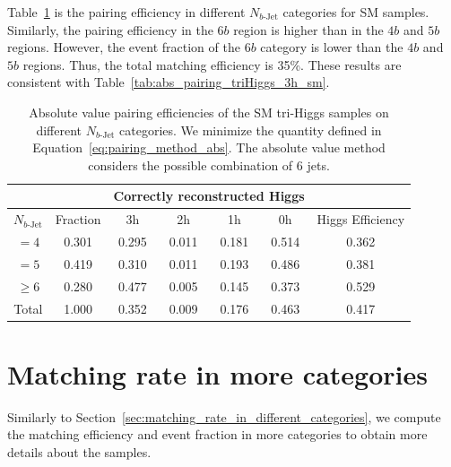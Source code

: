 \documentclass[12pt]{article}
\begin{document}
    Table~\ref{tab:sm_abs_pairing_3h_nbj} is the pairing efficiency in different $N_{b\text{-Jet}}$ categories for SM samples. Similarly, the pairing efficiency in the $6b$ region is higher than in the $4b$ and $5b$ regions. However, the event fraction of the $6b$ category is lower than the $4b$ and $5b$ regions. Thus, the total matching efficiency is 35\%. These results are consistent with Table~\ref{tab:abs_pairing_triHiggs_3h_sm}.
    \begin{table}[htpb]
        \centering
        \caption{Absolute value pairing efficiencies of the SM tri-Higgs samples on different $N_{b\text{-Jet}}$ categories. We minimize the quantity defined in Equation~\ref{eq:pairing_method_abs}. The absolute value method considers the possible combination of 6 jets.}
        \label{tab:sm_abs_pairing_3h_nbj}
        \begin{tabular}{c|c|cccc|c}
        \multicolumn{1}{l|}{} &          & \multicolumn{4}{c|}{Correctly reconstructed Higgs} & \multicolumn{1}{l}{} \\ \hline
        $N_{b\text{-Jet}}$    & Fraction & 3h          & 2h         & 1h         & 0h         & Higgs Efficiency     \\ \hline
        $=4$                  & 0.301 & 0.295 & 0.011 & 0.181 & 0.514 & 0.362 \\
        $=5$                  & 0.419 & 0.310 & 0.011 & 0.193 & 0.486 & 0.381 \\
        $\ge 6$               & 0.280 & 0.477 & 0.005 & 0.145 & 0.373 & 0.529 \\ \hline
        Total                 & 1.000 & 0.352 & 0.009 & 0.176 & 0.463 & 0.417
        \end{tabular}
    \end{table}
\section{Matching rate in more categories}%
\label{sec:matching_rate_in_more_categories}
    Similarly to Section~\ref{sec:matching_rate_in_different_categories}, we compute the matching efficiency and event fraction in more categories to obtain more details about the samples.
\end{document}
